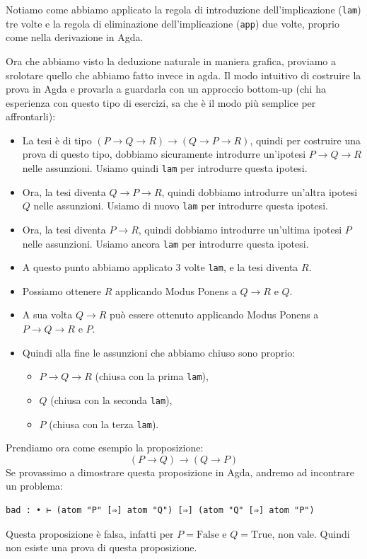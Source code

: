 \documentclass[a4paper]{article}
\theoremstyle{definition}
\theoremstyle{remark}
\begin{document}
\begin{Observation}{}{}{}
Notiamo come abbiamo applicato la regola di introduzione dell'implicazione (\texttt{lam}) tre volte
e la regola di eliminazione dell'implicazione (\texttt{app}) due volte, 
proprio come nella derivazione in Agda.
\end{Observation}
\noindent
Ora che abbiamo visto la deduzione naturale in maniera grafica,
proviamo a srolotare quello che abbiamo fatto invece in agda.
Il modo intuitivo di costruire la prova in Agda e provarla a guardarla
con un approccio bottom-up (chi ha esperienza con questo tipo di esercizi, sa che è il modo più semplice per affrontarli):
\begin{itemize}
  \item La tesi è di tipo \((P \to Q \to R) \to (Q \to P \to R)\), quindi per costruire una prova di questo tipo,
  dobbiamo sicuramente introdurre un'ipotesi \( P \to Q \to R \) nelle assunzioni. Usiamo quindi \texttt{lam} per introdurre questa ipotesi.
  \item Ora, la tesi diventa \( Q \to P \to R \), quindi dobbiamo introdurre un'altra ipotesi \( Q \) nelle assunzioni. Usiamo di nuovo \texttt{lam} per introdurre questa ipotesi.
  \item Ora, la tesi diventa \( P \to R \), quindi dobbiamo introdurre un'ultima ipotesi \( P \) nelle assunzioni. Usiamo ancora \texttt{lam} per introdurre questa ipotesi.
  \item A questo punto abbiamo applicato 3 volte \texttt{lam}, e la tesi diventa \( R \).
  \item Possiamo ottenere $R$ applicando Modus Ponens a $Q \to R$ e $Q$. 
  \item A sua volta $Q \to R$ può essere ottenuto applicando Modus Ponens a $P \to Q \to R$ e $P$.
  \item Quindi alla fine le assunzioni che abbiamo chiuso sono proprio:
  \begin{itemize}
    \item \( P \to Q \to R \) (chiusa con la prima \texttt{lam}),
    \item \( Q \) (chiusa con la seconda \texttt{lam}),
    \item \( P \) (chiusa con la terza \texttt{lam}).
  \end{itemize}
\end{itemize}
\noindent
Prendiamo ora come esempio la proposizione:
\[(P \to Q) \to (Q \to P)\]
Se provassimo a dimostrare questa proposizione in Agda,
andremo ad incontrare un problema:
\begin{verbatim}
bad : • ⊢ (atom "P" [⇒] atom "Q") [⇒] (atom "Q" [⇒] atom "P")
\end{verbatim}
Questa proposizione è falsa, infatti per $P = \text{False}$ e $Q = \text{True}$,
non vale. Quindi non esiste una prova di questa proposizione.
\end{document}

